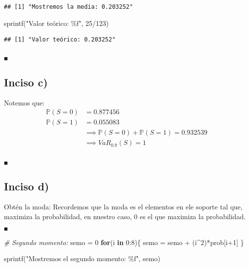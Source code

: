 \documentclass[
]{article}
\newenvironment{Shaded}{\begin{snugshade}}{\end{snugshade}}
\newcommand{\CommentTok}[1]{\textcolor[rgb]{0.56,0.35,0.01}{\textit{#1}}}
\newcommand{\ControlFlowTok}[1]{\textcolor[rgb]{0.13,0.29,0.53}{\textbf{#1}}}
\newcommand{\DecValTok}[1]{\textcolor[rgb]{0.00,0.00,0.81}{#1}}
\newcommand{\FunctionTok}[1]{\textcolor[rgb]{0.00,0.00,0.00}{#1}}
\newcommand{\NormalTok}[1]{#1}
\newcommand{\OtherTok}[1]{\textcolor[rgb]{0.56,0.35,0.01}{#1}}
\newcommand{\SpecialCharTok}[1]{\textcolor[rgb]{0.00,0.00,0.00}{#1}}
\newcommand{\StringTok}[1]{\textcolor[rgb]{0.31,0.60,0.02}{#1}}
\begin{document}
\begin{verbatim}
## [1] "Mostremos la media: 0.203252"
\end{verbatim}

\begin{Shaded}
\begin{Highlighting}[]
\FunctionTok{sprintf}\NormalTok{(}\StringTok{"Valor teórico: \%f"}\NormalTok{, }\DecValTok{25}\SpecialCharTok{/}\DecValTok{123}\NormalTok{)}
\end{Highlighting}
\end{Shaded}

\begin{verbatim}
## [1] "Valor teórico: 0.203252"
\end{verbatim}

\(_\blacksquare\)

\hypertarget{inciso-c-4}{%
\subsection{Inciso c)}\label{inciso-c-4}}

Notemos que: \begin{align*}
\mathbb{P}(S = 0) &= 0.877456\\
\mathbb{P}(S = 1) &= 0.055083\\
&\implies \mathbb{P}(S = 0) + \mathbb{P}(S = 1) = 0.932539\\
&\implies VaR_{0.9}(S) = 1
\end{align*}

\(_\blacksquare\)

\hypertarget{inciso-d-4}{%
\subsection{Inciso d)}\label{inciso-d-4}}

Obtén la moda: Recordemos que la moda es el elementos en ele soporte tal
que, maximiza la probabilidad, en nuestro caso, 0 es el que maximiza la
probabilidad. \(_\blacksquare\)

\begin{Shaded}
\begin{Highlighting}[]
\CommentTok{\# Segundo momento:}
\NormalTok{semo }\OtherTok{=} \DecValTok{0}
\ControlFlowTok{for}\NormalTok{(i }\ControlFlowTok{in} \DecValTok{0}\SpecialCharTok{:}\DecValTok{8}\NormalTok{)\{}
\NormalTok{  semo }\OtherTok{=}\NormalTok{ semo }\SpecialCharTok{+}\NormalTok{ (i}\SpecialCharTok{\^{}}\DecValTok{2}\NormalTok{)}\SpecialCharTok{*}\NormalTok{prob[i}\SpecialCharTok{+}\DecValTok{1}\NormalTok{]}
\NormalTok{\}}

\FunctionTok{sprintf}\NormalTok{(}\StringTok{"Mostremos el segundo momento: \%f"}\NormalTok{, semo)}
\end{Highlighting}
\end{Shaded}
\end{document}
